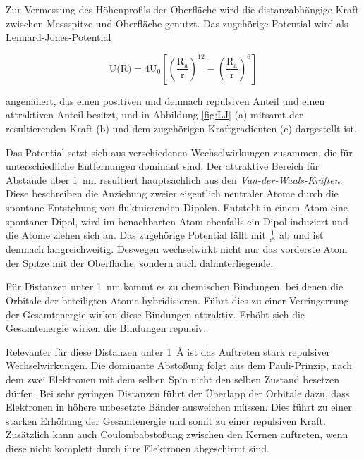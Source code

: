           Zur Vermessung des Höhenprofils der Oberfläche wird die distanzabhängige Kraft zwischen Messspitze und Oberfläche genutzt. Das zugehörige Potential wird als Lennard-Jones-Potential 

          \begin{equation*}
            \text{U(R)} = 4\text{U}_0 \left[ \left(\frac{\text{R}_{\text{a}}}{\text{r}}\right)^{12} - \left(\frac{\text{R}_{\text{a}}}{\text{r}}\right)^{6} \right]
          \end{equation*}

          angenähert, das einen positiven und demnach repulsiven Anteil und einen attraktiven Anteil besitzt, und in Abbildung \ref{fig:LJ} (a) mitsamt der resultierenden Kraft (b) und dem zugehörigen
          Kraftgradienten (c) dargestellt ist.


          

          Das Potential setzt sich aus verschiedenen Wechselwirkungen zusammen, die für unterschiedliche Entfernungen dominant sind.\newline 
          Der attraktive Bereich für Abstände über \SI{1}{\nano\metre} resultiert hauptsächlich aus den \textit{Van-der-Waals-Kräften}. Diese beschreiben die Anziehung zweier eigentlich neutraler Atome durch die 
          spontane Entstehung von fluktuierenden Dipolen. Entsteht in einem Atom eine 
          spontaner Dipol, wird im benachbarten Atom ebenfalls ein Dipol induziert und die Atome ziehen sich an. Das zugehörige Potential fällt mit $\frac{1}{\text{r}^6}$ ab und ist demnach langreichweitig. 
          Deswegen wechselwirkt nicht nur das vorderste Atom der Spitze mit der Oberfläche, sondern auch dahinterliegende.\newline

          Für Distanzen unter \SI{1}{\nano\metre} kommt es zu chemischen Bindungen, bei denen die Orbitale der beteiligten Atome hybridisieren. Führt dies zu einer Verringerrung der Gesamtenergie wirken diese 
          Bindungen attraktiv. Erhöht sich die Gesamtenergie wirken die Bindungen repulsiv.

          Relevanter für diese Distanzen unter \SI{1}{\angstrom} ist das Auftreten stark repulsiver Wechselwirkungen. Die dominante Abstoßung folgt aus dem Pauli-Prinzip, nach dem zwei Elektronen mit dem 
          selben Spin nicht den selben Zustand besetzen dürfen. Bei sehr geringen Distanzen führt der Überlapp der Orbitale dazu, dass Elektronen in höhere unbesetzte Bänder ausweichen müssen. Dies führt zu einer 
          starken Erhöhung der Gesamtenergie und somit zu einer repulsiven Kraft. Zusätzlich kann auch Coulombabstoßung zwischen den Kernen auftreten, wenn diese nicht komplett durch ihre Elektronen 
          abgeschirmt sind.

